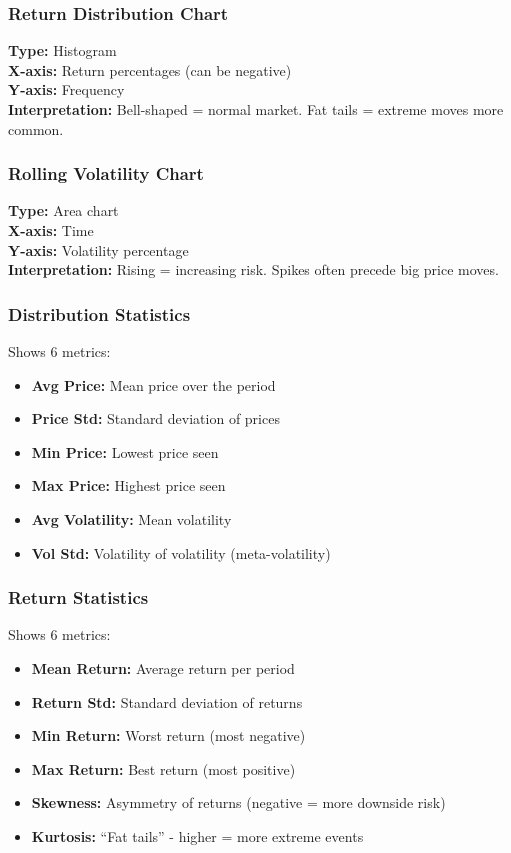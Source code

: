 \documentclass[12pt,a4paper]{article}
\begin{document}
\subsubsection{Return Distribution Chart}
\textbf{Type:} Histogram\\
\textbf{X-axis:} Return percentages (can be negative)\\
\textbf{Y-axis:} Frequency\\
\textbf{Interpretation:} Bell-shaped = normal market. Fat tails = extreme moves more common.

\subsubsection{Rolling Volatility Chart}
\textbf{Type:} Area chart\\
\textbf{X-axis:} Time\\
\textbf{Y-axis:} Volatility percentage\\
\textbf{Interpretation:} Rising = increasing risk. Spikes often precede big price moves.

\subsubsection{Distribution Statistics}
Shows 6 metrics:
\begin{itemize}
    \item \textbf{Avg Price:} Mean price over the period
    \item \textbf{Price Std:} Standard deviation of prices
    \item \textbf{Min Price:} Lowest price seen
    \item \textbf{Max Price:} Highest price seen
    \item \textbf{Avg Volatility:} Mean volatility
    \item \textbf{Vol Std:} Volatility of volatility (meta-volatility)
\end{itemize}

\subsubsection{Return Statistics}
Shows 6 metrics:
\begin{itemize}
    \item \textbf{Mean Return:} Average return per period
    \item \textbf{Return Std:} Standard deviation of returns
    \item \textbf{Min Return:} Worst return (most negative)
    \item \textbf{Max Return:} Best return (most positive)
    \item \textbf{Skewness:} Asymmetry of returns (negative = more downside risk)
    \item \textbf{Kurtosis:} ``Fat tails'' - higher = more extreme events
\end{itemize}
\end{document}
